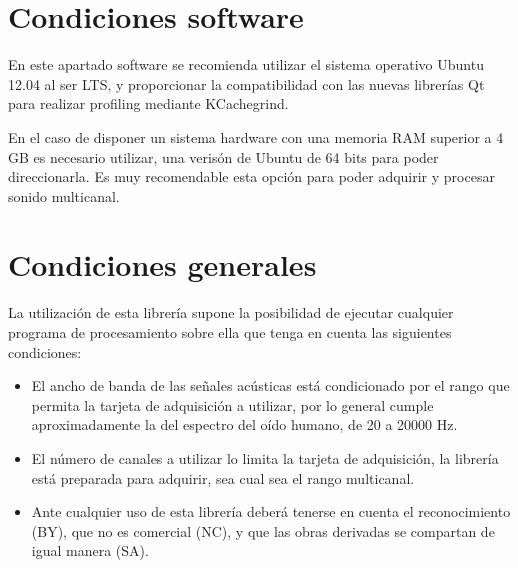 \section{Condiciones software}

En este apartado software se recomienda utilizar el sistema operativo Ubuntu 12.04 al ser LTS, y proporcionar la compatibilidad con las nuevas librerías Qt para realizar profiling mediante KCachegrind.

En el caso de disponer un sistema hardware con una memoria RAM superior a 4 GB es necesario utilizar, una verisón de Ubuntu de 64 bits para poder direccionarla. Es muy recomendable esta opción para poder adquirir y procesar sonido multicanal.

\newpage
\section{Condiciones generales}

La utilización de esta librería supone la posibilidad de ejecutar cualquier programa de procesamiento sobre ella que tenga en cuenta las siguientes condiciones:

\begin{itemize}
  \item El ancho de banda de las señales acústicas está condicionado por el rango que permita la tarjeta de adquisición a utilizar, por lo general cumple aproximadamente la del espectro del oído humano, de 20 a 20000 Hz.
  \item El número de canales a utilizar lo limita la tarjeta de adquisición, la librería está preparada para adquirir, sea cual sea el rango multicanal.
  \item Ante cualquier uso de esta librería deberá tenerse en cuenta el reconocimiento (BY), que no es comercial (NC), y que las obras derivadas se compartan de igual manera (SA).

\end{itemize}

